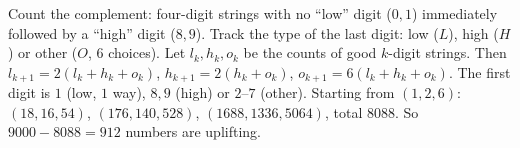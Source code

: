 Count the complement: four-digit strings with no ``low'' digit ($0,1$) immediately followed by a ``high'' digit ($8,9$). Track the type of the last digit: low ($L$), high ($H$) or other ($O$, $6$ choices). Let $l_k,h_k,o_k$ be the counts of good $k$-digit strings. Then $l_{k+1}=2(l_k+h_k+o_k)$, $h_{k+1}=2(h_k+o_k)$, $o_{k+1}=6(l_k+h_k+o_k)$. The first digit is $1$ (low, $1$ way), $8,9$ (high) or $2$--$7$ (other). Starting from $(1,2,6)$: $(18,16,54)$, $(176,140,528)$, $(1688,1336,5064)$, total $8088$. So $9000-8088=\boxed{912}$ numbers are uplifting.
